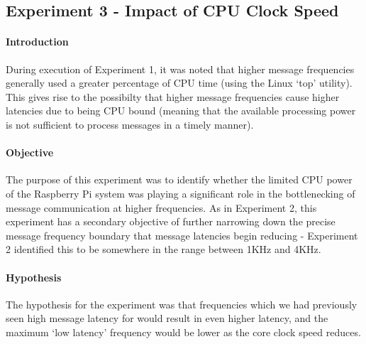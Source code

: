 \documentclass[../dissertation.tex]{subfiles}
\begin{document}
\subsection{Experiment 3 - Impact of CPU Clock Speed}
\label{experiment3-cpu-speed}

\paragraph{Introduction} During execution of Experiment 1, it was noted that higher message frequencies generally used a greater percentage of CPU time (using the Linux `top' utility). This gives rise to the possibilty that higher message frequencies cause higher latencies due to being CPU bound (meaning that the available processing power is not sufficient to process messages in a timely manner).

\paragraph{Objective} The purpose of this experiment was to identify whether the limited CPU power of the Raspberry Pi system was playing a significant role in the bottlenecking of message communication at higher frequencies. As in Experiment 2, this experiment has a secondary objective of further narrowing down the precise message frequency boundary that message latencies begin reducing - Experiment 2 identified this to be somewhere in the range between 1KHz and 4KHz.

\paragraph{Hypothesis} The hypothesis for the experiment was that frequencies which we had previously seen high message latency for would result in even higher latency, and the maximum `low latency' frequency would be lower as the core clock speed reduces.
\end{document}
